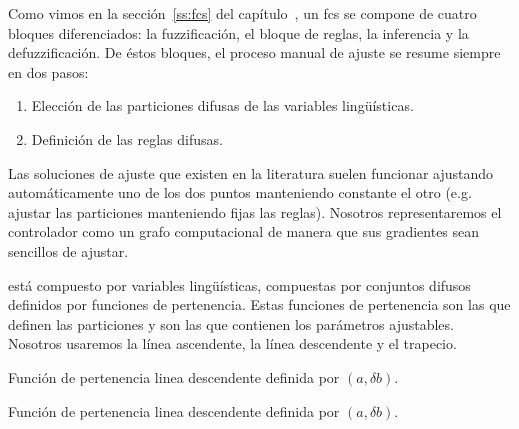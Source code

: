 Como vimos en la sección~\ref{ss:fcs} del capítulo~, un \ac{fcs} se compone de cuatro bloques diferenciados: la fuzzificación, el bloque de reglas, la inferencia y la defuzzificación. De éstos bloques, el proceso manual de ajuste se resume siempre en dos pasos:

\begin{enumerate}
	\item Elección de las particiones difusas de las variables lingüísticas.
	\item Definición de las reglas difusas.
\end{enumerate}

Las soluciones de ajuste que existen en la literatura suelen funcionar ajustando automáticamente uno de los dos puntos manteniendo constante el otro (e.g. ajustar las particiones manteniendo fijas las reglas). Nosotros representaremos el controlador como un grafo computacional de manera que sus gradientes sean sencillos de ajustar.

 está compuesto por variables lingüísticas, compuestas por conjuntos difusos definidos por funciones de pertenencia. Estas funciones de pertenencia son las que definen las particiones y son las que contienen los parámetros ajustables. Nosotros usaremos la línea ascendente, la línea descendente y el trapecio.

\begin{marginfigure}
	\caption{Función de pertenencia linea descendente definida por $(a, \delta b)$.}
	\label{fig:line-asc}
\end{marginfigure}

\begin{marginfigure}
	\caption{Función de pertenencia linea descendente definida por $(a, \delta b)$.}
	\label{fig:line-desc}
\end{marginfigure}

